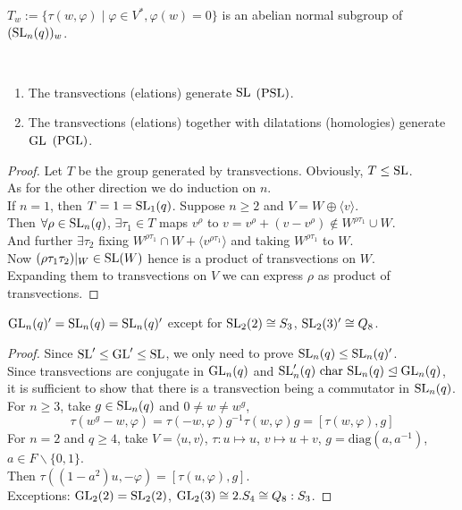 \documentclass[a4paper,11pt]{article}
\begin{document}
\begin{lemma}\label{abelian normal subgroup}
    $T_w:=\{\tau(w,\varphi)\mid \varphi\in V^*, \varphi(w)=0\}$ is an abelian normal subgroup of $(\mathrm{SL}_n(q))_w$.
\end{lemma}

\begin{lemma}\label{generating}\ 
    \begin{enumerate}[itemsep=0pt,label=\roman*.]
        \item The transvections (elations) generate $\mathrm{SL}$ $(\mathrm{PSL})$.
        \item The transvections (elations) together with dilatations (homologies) generate $\mathrm{GL}$ $(\mathrm{PGL})$.
    \end{enumerate}
\end{lemma}

\begin{proof}
    Let $T$ be the group generated by transvections. Obviously, $T\leq \mathrm{SL}$. \\As for the other direction we do induction on $n$.\\If $n=1$, then $T=1=\mathrm{SL}_1(q)$. Suppose $n\geq 2$ and $V=W\oplus\langle v\rangle$. \\
    Then $\forall \rho\in\mathrm{SL}_n(q)$, $\exists \tau_1\in T$ maps $v^{\rho}$ to $v=v^{\rho}+(v-v^{\rho})\not\in  W^{\rho\tau_1}\cup W$. \\
    And further $\exists \tau_2$ fixing $W^{\rho\tau_1}\cap W+\langle v^{\rho \tau_1}\rangle$ and taking $W^{\rho \tau_1}$ to $W$.\\
    Now $(\rho\tau_1\tau_2)|_W\in\mathrm{SL}(W)$ hence is a product of transvections on $W$.\\
    Expanding them to transvections on $V$ we can express $\rho$ as product of transvections.
\end{proof}

\begin{lemma}\label{perfectness}
    $\mathrm{GL}_n(q)'=\mathrm{SL}_n(q)=\mathrm{SL}_n(q)'$ except for $\mathrm{SL}_2(2)\cong S_3$, $\mathrm{SL}_2(3)'\cong Q_8$.
\end{lemma}
\begin{proof}
    Since $\mathrm{SL}'\leq \mathrm{GL}'\leq \mathrm{SL}$, we only need to prove $\mathrm{SL}_n(q)\leq \mathrm{SL}_n(q)'$. \\Since transvections are conjugate in $\mathrm{GL}_n(q)$ and $\mathrm{SL}'_n(q)\ \mathrm{char}\ \mathrm{SL}_n(q)\trianglelefteq \mathrm{GL}_n(q)$, \\
    it is sufficient to show that there is a transvection being a commutator in $\mathrm{SL}_n(q)$.  \\
    For $n\geq 3$, take $g\in\mathrm{SL}_n(q)$ and $0\neq w\neq w^g$, \[\tau(w^g-w,\varphi)=\tau(-w,\varphi)g^{-1}\tau(w,\varphi)g=[\tau(w,\varphi),g]\]
    For $n=2$ and $q\geq 4$, take $V=\langle u,v\rangle$, $\tau:u\mapsto u$, $v\mapsto u+v$, $g=\mathrm{diag}(a,a^{-1})$, $a\in F\backslash\{0,1\}$. \\
    Then $\tau((1-a^2)u,-\varphi)=[\tau(u,\varphi),g]$.\\
    Exceptions: $\mathrm{GL}_2(2)=\mathrm{SL}_2(2)$, $\mathrm{GL}_2(3)\cong 2.S_4\cong Q_8:S_3$.
\end{proof}
\end{document}
